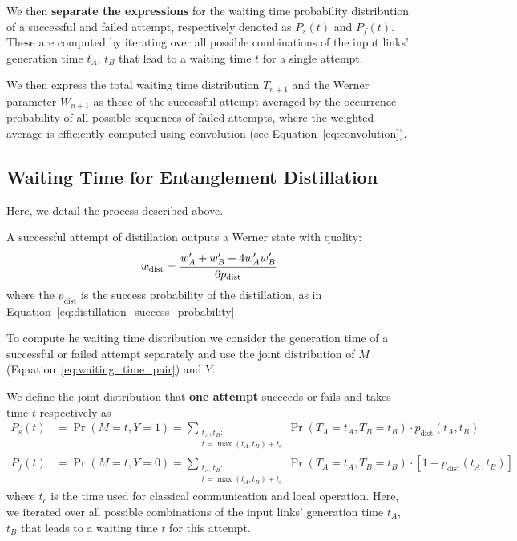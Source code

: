 \documentclass{masterthesis}
\begin{document}
We then \textbf{separate the expressions} for the waiting time probability distribution of a successful and failed attempt, respectively denoted as $P_s(t)$ and $P_f(t)$.
These are computed by iterating over all possible combinations of the input links' generation time $t_A$, $t_B$ that lead to a waiting time $t$ for a single attempt.

We then express the total waiting time distribution $T_{n+1}$ and the Werner parameter $W_{n+1}$ as those of the successful attempt averaged by the occurrence probability of all possible sequences of failed attempts, where the weighted average is efficiently computed using convolution (see Equation~\ref{eq:convolution}).

\subsection{Waiting Time for Entanglement Distillation}

Here, we detail the process described above.

A successful attempt of distillation outputs a Werner state with quality:
\begin{equation}
    w_\text{dist} = \cfrac{w_A' + w_B' + 4 w_A' w_B'}{6 p_\text{dist}}
\end{equation}
where the $p_\text{dist}$ is the success probability of the distillation, as in Equation~\ref{eq:distillation_success_probability}.

To compute he waiting time distribution we consider the generation time of a successful or failed attempt separately and use the joint distribution of $M$ (Equation~\ref{eq:waiting_time_pair}) and $Y$.

We define the joint distribution that \textbf{one attempt} succeeds or fails and takes time $t$ respectively as
\begin{align}\label{eq:waiting_time_success_failure}
    P_s(t) &= \Pr(M = t, Y = 1) = \sum_{\substack{t_A, t_B : \\ t = \max(t_A, t_B) + t_c}} \Pr(T_A = t_A, T_B = t_B) \cdot p_\text{dist}(t_A, t_B) \\
    P_f(t) &= \Pr(M = t, Y = 0) = \sum_{\substack{t_A, t_B : \\ t = \max(t_A, t_B) + t_c}} \Pr(T_A = t_A, T_B = t_B) \cdot [1 - p_\text{dist}(t_A, t_B)]
\end{align}
where $t_c$ is the time used for classical communication and local operation. Here, we iterated over all possible combinations of the input links' generation time $t_A$, $t_B$ that leads to a waiting time $t$ for this attempt.
\end{document}
